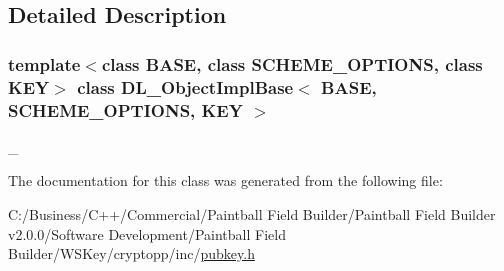 \subsection{Detailed Description}
\subsubsection*{template$<$class BASE, class SCHEME\_\-OPTIONS, class KEY$>$ class DL\_\-ObjectImplBase$<$ BASE, SCHEME\_\-OPTIONS, KEY $>$}

\_\- 

The documentation for this class was generated from the following file:\begin{DoxyCompactItemize}
\item 
C:/Business/C++/Commercial/Paintball Field Builder/Paintball Field Builder v2.0.0/Software Development/Paintball Field Builder/WSKey/cryptopp/inc/\hyperlink{pubkey_8h}{pubkey.h}\end{DoxyCompactItemize}
